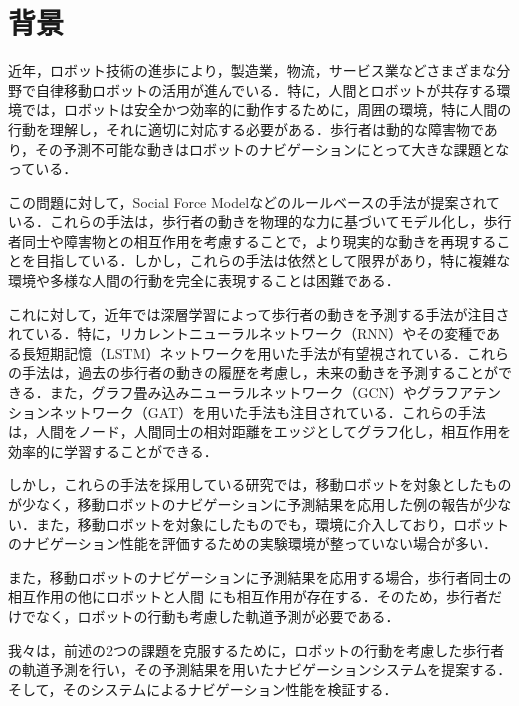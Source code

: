 
\section{背景}
近年，ロボット技術の進歩により，製造業，物流，サービス業などさまざまな分野で自律移動ロボットの活用が進んでいる．特に，人間とロボットが共存する環境では，ロボットは安全かつ効率的に動作するために，周囲の環境，特に人間の行動を理解し，それに適切に対応する必要がある．歩行者は動的な障害物であり，その予測不可能な動きはロボットのナビゲーションにとって大きな課題となっている．

この問題に対して，Social Force Model\cite{s-lstm}などのルールベースの手法が提案されている．これらの手法は，歩行者の動きを物理的な力に基づいてモデル化し，歩行者同士や障害物との相互作用を考慮することで，より現実的な動きを再現することを目指している．しかし，これらの手法は依然として限界があり，特に複雑な環境や多様な人間の行動を完全に表現することは困難である．


これに対して，近年では深層学習によって歩行者の動きを予測する手法が注目されている．特に，リカレントニューラルネットワーク（RNN）\cite{rumelhart1986learning1,rumelhart1986learning2}やその変種である長短期記憶（LSTM）\cite{hochreiter1997long}ネットワークを用いた手法が有望視されている．これらの手法は，過去の歩行者の動きの履歴を考慮し，未来の動きを予測することができる．また，グラフ畳み込みニューラルネットワーク（GCN）\cite{kipf2016semi-gcn}やグラフアテンションネットワーク（GAT）\cite{velickovic2017graph-gat}を用いた手法も注目されている．これらの手法は，人間をノード，人間同士の相対距離をエッジとしてグラフ化し，相互作用を効率的に学習することができる．

しかし，これらの手法を採用している研究では，移動ロボットを対象としたものが少なく，移動ロボットのナビゲーションに予測結果を応用した例の報告が少ない．また，移動ロボットを対象にしたものでも，環境に介入しており，ロボットのナビゲーション性能を評価するための実験環境が整っていない場合が多い．

また，移動ロボットのナビゲーションに予測結果を応用する場合，歩行者同士の相互作用の他にロボットと人間
にも相互作用が存在する．そのため，歩行者だけでなく，ロボットの行動も考慮した軌道予測が必要である．

我々は，前述の2つの課題を克服するために，ロボットの行動を考慮した歩行者の軌道予測を行い，その予測結果を用いたナビゲーションシステムを提案する．そして，そのシステムによるナビゲーション性能を検証する．


\newpage

